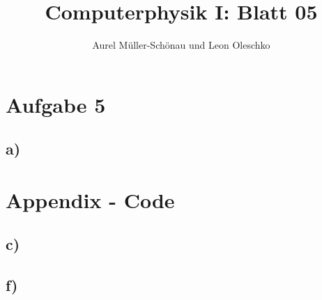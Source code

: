 


\setcounter{secnumdepth}{0}



\title{Computerphysik I: Blatt 05}
\author{Aurel Müller-Schönau und Leon Oleschko}
\maketitle

\section{Aufgabe 5}
\subsection{a)}


\clearpage
\section*{Appendix - Code}
\subsection*{c)}


\clearpage
\subsection*{f)}



